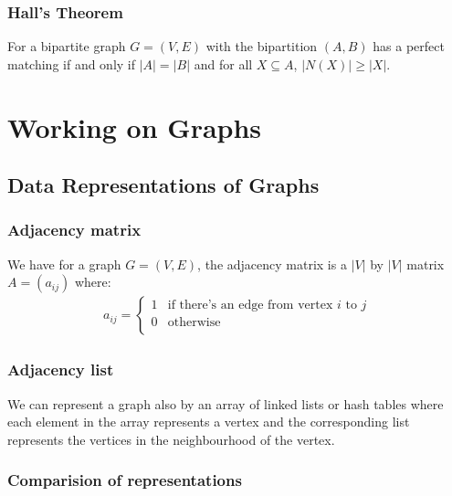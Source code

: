 \documentclass[a4paper, 12pt, twoside]{article}
\begin{document}
\subsubsection{Hall's Theorem}

For a bipartite graph $G = (V, E)$ with the bipartition $(A, B)$ has
a perfect matching if and only if $|A| = |B|$ and for all 
$X \subseteq A$, $|N(X)| \geq |X|$. 

\vfill

\section{Working on Graphs}

\subsection{Data Representations of Graphs}

\subsubsection{Adjacency matrix}

We have for a graph $G = (V, E)$, the adjacency matrix is a
$|V|$ by $|V|$ matrix $A = (a_{ij})$ where: \begin{gather*}
  a_{ij} = \begin{cases}
    1 & \text{if there's an edge from vertex $i$ to $j$} \\
    0 & \text{otherwise} \\
  \end{cases}
\end{gather*}

\subsubsection{Adjacency list}

We can represent a graph also by an array of linked lists or 
hash tables where
each element in the array represents a vertex and the corresponding
list represents the vertices in the neighbourhood of the vertex.

\newpage

\subsubsection{Comparision of representations}
\end{document}
